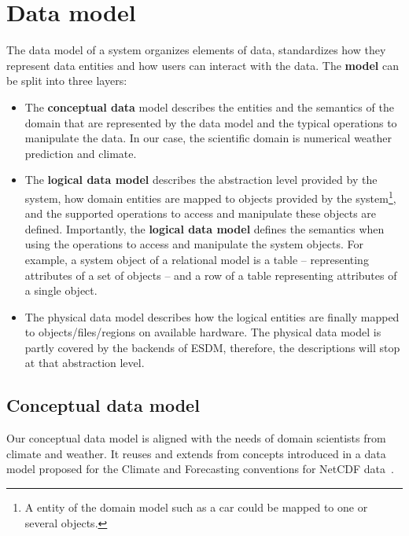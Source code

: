 \section{Data model}%
\label{data-model}

The data model of a system organizes elements of data, standardizes how they represent data entities and how users can interact with the data.
The \textbf{model} can be split into three layers:

\begin{itemize}
  \item The \textbf{conceptual data} model describes the entities and the semantics of the domain that are represented by the data model and the typical operations to manipulate the data. 
    In our case, the scientific domain is numerical weather prediction and climate.
  \item The \textbf{logical data model} describes the abstraction level provided by the system, how domain entities are mapped to objects provided by the system\footnote{A entity of the domain model such as a car could be mapped to one or several objects.}, and the supported operations to access and manipulate these objects are defined.
    Importantly, the \textbf{logical data model} defines the semantics when using the operations to access and manipulate the system objects.
    For example, a system object of a relational model is a table -- representing attributes of a set of objects -- and a row of a table representing attributes of a single object.
  \item The physical data model describes how the logical entities are finally mapped to objects/files/regions on available hardware. 
    The physical data model is partly covered by the backends of ESDM, therefore, the descriptions will stop at that abstraction level.
\end{itemize}

\subsection{Conceptual data model}

Our conceptual data model is aligned with the needs of domain scientists from climate and weather. 
It reuses and extends from concepts introduced in a data model proposed for the Climate and Forecasting conventions for NetCDF data~\cite{gmd-10-4619-2017}.

